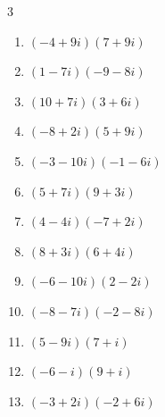 \begin{multicols}{3}
\begin{enumerate}
  \item $\displaystyle (-4+9i)(7+9i)$

        \phantom{$\displaystyle =-109+27i$}

  \item $\displaystyle (1-7i)(-9-8i)$

        \phantom{$\displaystyle =-65+55i$}

  \item $\displaystyle (10+7i)(3+6i)$

        \phantom{$\displaystyle =-12+81i$}

  \item $\displaystyle (-8+2i)(5+9i)$

        \phantom{$\displaystyle =-58-62i$}

  \item $\displaystyle (-3-10i)(-1-6i)$

        \phantom{$\displaystyle =-57+28i$}

\columnbreak %

  \item $\displaystyle (5+7i)(9+3i)$

        \phantom{$\displaystyle =24+78i$}

  \item $\displaystyle (4-4i)(-7+2i)$

        \phantom{$\displaystyle =-20+36i$}

  \item $\displaystyle (8+3i)(6+4i)$

        \phantom{$\displaystyle =36+50i$}

  \item $\displaystyle (-6-10i)(2-2i)$

        \phantom{$\displaystyle =-32-8i$}

  \item $\displaystyle (-8-7i)(-2-8i)$

        \phantom{$\displaystyle =-40+78i$}

  \item $\displaystyle (5-9i)(7+i)$

        \phantom{$\displaystyle =44-58i$}

  \item $\displaystyle (-6-i)(9+i)$

        \phantom{$\displaystyle =-53-15i$}

  \item $\displaystyle (-3+2i)(-2+6i)$


\end{enumerate}
\end{multicols}
